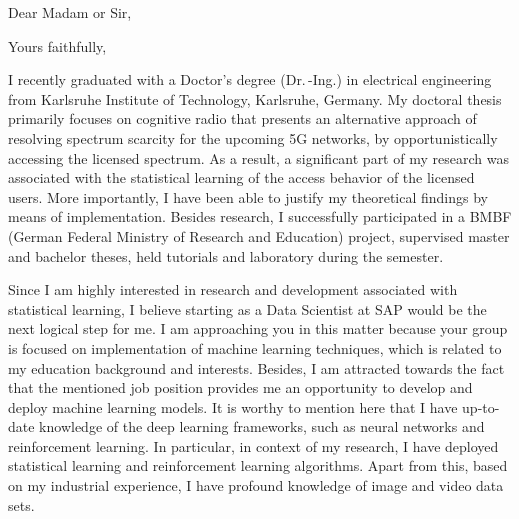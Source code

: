 \documentclass[12pt,a4paper,sans]{moderncv}        %
\begin{document}
\date{\today}
\opening{Dear Madam or Sir,}
\closing{Yours faithfully,}
\makelettertitle
I recently graduated with a Doctor's degree (Dr.\,-Ing.) in electrical engineering from Karlsruhe Institute of Technology, Karlsruhe, Germany. My doctoral thesis primarily focuses on cognitive radio that presents an alternative approach of resolving spectrum scarcity for the upcoming 5G networks, by opportunistically accessing the licensed spectrum. As a result, a significant part of my research was associated with the statistical learning of the access behavior of the licensed users. More importantly, I have been able to justify my theoretical findings by means of implementation. 
Besides research, I successfully participated in a BMBF (German Federal Ministry of Research and Education) project, supervised master and bachelor theses, held tutorials and laboratory during the semester. 


Since I am highly interested in research and development associated with statistical learning, I believe starting as a Data Scientist at SAP would be the next logical step for me. I am approaching you in this matter because your group is focused on implementation of machine learning techniques, which is related to my education background and interests. Besides, I am attracted towards the fact that the mentioned job position provides me an opportunity to develop and deploy machine learning models. 
It is worthy to mention here that I have up-to-date knowledge of the deep learning frameworks, such as neural networks and reinforcement learning. In particular, in context of my research, I have deployed statistical learning and reinforcement learning algorithms. Apart from this, based on my industrial experience, I have profound knowledge of image and video data sets.   
\end{document}
